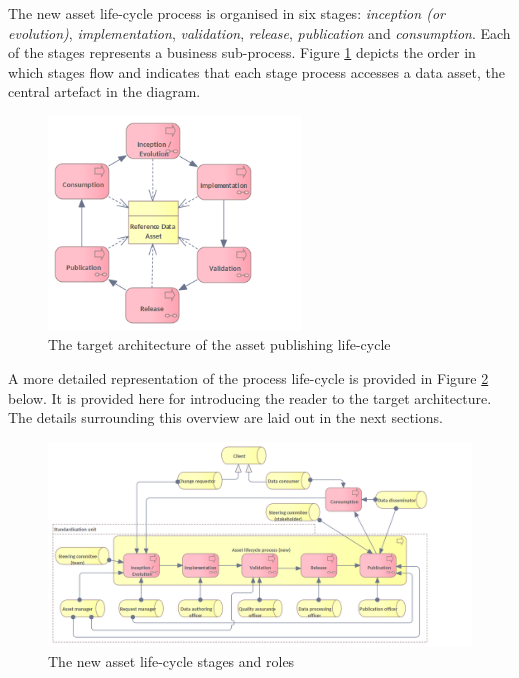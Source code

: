 	The new asset life-cycle process is organised in six stages: \textit{inception (or evolution)}, \textit{implementation}, \textit{validation}, \textit{release}, \textit{publication} and \textit{consumption}. Each of the stages represents a business sub-process. Figure \ref{fig:lifecycle-new-stages-overview} depicts the order in which stages flow and indicates that each stage process accesses a data asset, the central artefact in the diagram.
	
	\begin{figure}[h]
		\centering
		\includegraphics[width=0.6\textwidth]{images/business/Lifecycle process only (new).png}
		\caption{The target architecture of the asset publishing life-cycle}
		\label{fig:lifecycle-new-stages-overview}
	\end{figure}
	
	A more detailed representation of the process life-cycle is provided in Figure \ref{fig:lifecycle-new-overview} below. It is provided here for introducing the reader to the target architecture. The details surrounding this overview are laid out in the next sections. 
	
	\begin{figure}[h]
		\centering
		\includegraphics[width=1.05\textwidth]{images/business/Lifecycle (new).png}
		\caption{The new asset life-cycle stages and roles}
		\label{fig:lifecycle-new-overview}
	\end{figure}
	
